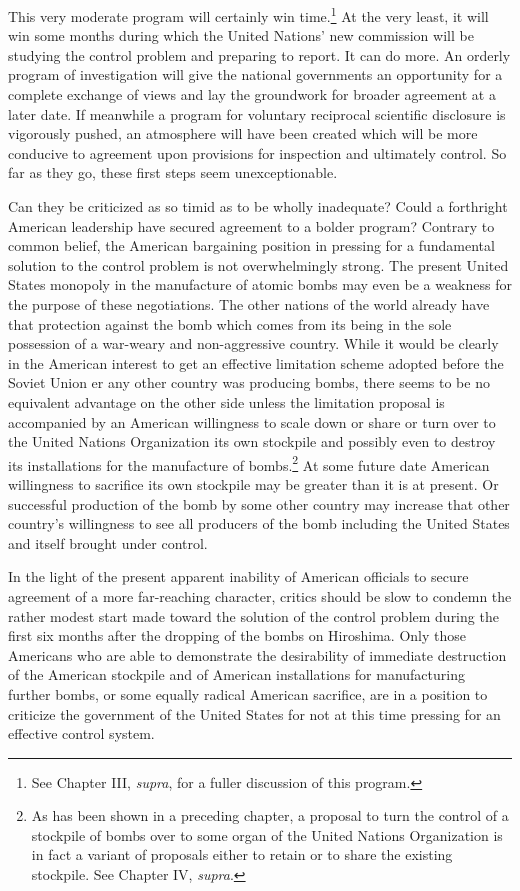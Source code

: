 This very moderate program will certainly win time.\footnote{See Chapter III, \textit{supra}, for a fuller discussion of this program.} At the very least, it will win some months during which the United Nations' new commission will be studying the control problem and preparing to report. It can do more. An orderly program of investigation will give the national governments an opportunity for a complete exchange of views and lay the groundwork for broader agreement at a later date. If meanwhile a program for voluntary reciprocal scientific disclosure is vigorously pushed, an atmosphere will have been created which will be more conducive to agreement upon provisions for inspection and ultimately control. So far as they go, these first steps seem unexceptionable.

Can they be criticized as so timid as to be wholly inadequate? Could a forthright American leadership have secured agreement to a bolder program? Contrary to common belief, the American bargaining position in pressing for a fundamental solution to the control problem is not overwhelmingly strong. The present United States monopoly in the manufacture of atomic bombs may even be a weakness for the purpose of these negotiations. The other nations of the world already have that protection against the bomb which comes from its being in the sole possession of a war-weary and non-aggressive country. While it would be clearly in the American interest to get an effective limitation scheme adopted before the Soviet Union er any other country was producing bombs, there seems to be no equivalent advantage on the other side unless the limitation proposal is accompanied by an American willingness to scale down or share or turn over to the United Nations Organization its own stockpile and possibly even to destroy its installations for the manufacture of bombs.\footnote{As has been shown in a preceding chapter, a proposal to turn the control of a stockpile of bombs over to some organ of the United Nations Organization is in fact a variant of proposals either to retain or to share the existing stockpile. See Chapter IV, \textit{supra}.} At some future date American willingness to sacrifice its own stockpile may be greater than it is at present. Or successful production of the bomb by some other country may increase that other country's willingness to see all producers of the bomb including the United States and itself brought under control.

In the light of the present apparent inability of American officials to secure agreement of a more far-reaching character, critics should be slow to condemn the rather modest start made toward the solution of the control problem during the first six months after the dropping of the bombs on Hiroshima. Only those Americans who are able to demonstrate the desirability of immediate destruction of the American stockpile and of American installations for manufacturing further bombs, or some equally radical American sacrifice, are in a position to criticize the government of the United States for not at this time pressing for an effective control system.


